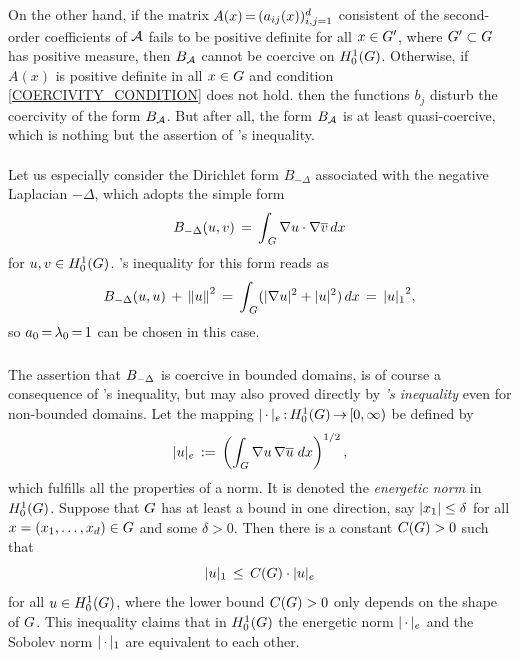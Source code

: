 \documentclass[11pt,twoside]{article}
\begin{document}
\subparagraph*{}
On the other hand,
if the matrix $A(x) {\,=\,} (a_{ij}(x))_{i,j=1}^d$ consistent of the second-order
coefficients of ${\mathcal{A}}$ fails to be positive definite for all $x \in G'$,
where $G' \subset G$ has positive measure,
then $B_{{\mathcal{A}}}$ cannot be coercive on $H_0^{1}(G)$.
Otherwise,
if $A(x)$ is positive definite in all $x \in G$ and 
condition \eqref{COERCIVITY_CONDITION} does not hold.
then the functions $b_j$ disturb the coercivity of the form $B_{{\mathcal{A}}}$.
But after all,
the form $B_{{\mathcal{A}}}$ is at least quasi-coercive,
which is nothing but the assertion of \textsc{\GARDING}'s inequality.

\paragraph*{} %
Let us especially consider the Dirichlet form $B_{-\Delta}$
associated with the negative Laplacian $-\Delta$,
which adopts the simple form
\begin{equation}\label{LAPLACE_DIRICHLET_FORM}
B_{-\Delta}(u,v) \,=\, \int_{\,G} \nabla u \cdot \nabla \overline{v} \, dx
\end{equation}
for $u,v \in H_0^{1}(G)$.
\textsc{{\GARDING}}'s inequality for this form reads as 
\[
\DF_{-\Delta}(u,u) \, + \, \norm{u}^2 \=
\int_{\,\G} (\abs{\nabla u} ^2 + \abs{u} ^2) \, dx \= {\abs{u} _1}^2,
\]
so $a_0 {\,=\,} \lambda_0 {\,=\,} 1$ can be chosen in this case.

\subparagraph*{} %
The assertion that $B_{-\Delta}$ is coercive in bounded domains,
is of course a consequence of \textsc{{\GARDING}}'s inequality,
but may also proved directly by \textsc{{\POINCARE}}\textit{'s inequality}
even for non-bounded domains.
Let the mapping $\abs{\,\cdot\,} _e \:\HN{1}{\G} \xto [0,\infty)$ be defined by
\[
\abs{u} _e \eqdef
\left(
\int_{\G} \nabla u \, \nabla \overline{u} \; dx
\right) ^{1/2},
\]
which fulfills all the properties of a norm.
It is denoted the \textit{energetic norm} in $H_0^{1}(G)$.
Suppose that $G$ has at least a bound in one direction,
say $\abs{x_1} \leq \delta$
for all $x=(x_1,\ldots,x_d) \in G$ and some $\delta > 0$.
Then there is a constant $C(G) > 0$
such that
\begin{equation}\label{POINCARE_INEQUALITY}
\abs{u} _1 \, \leq \, C(\G) \cdot {\abs{u} _e}
\end{equation}
for all $u \in H_0^{1}(G)$,
where the lower bound $C(G) > 0$ only depends on the shape of $G$.
This inequality claims
that in $H_0^{1}(G)$
the energetic norm $\abs{\,\cdot\,} _e$
and the Sobolev norm $\abs{\,\cdot\,} _1$
are equivalent to each other.

\end{document}

